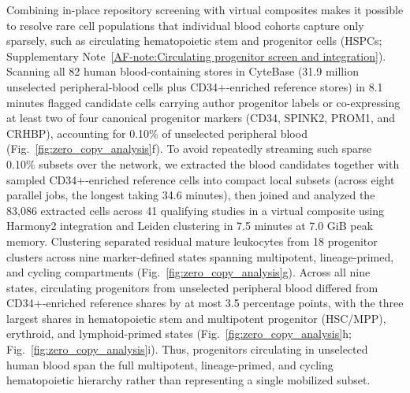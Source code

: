 \documentclass[11pt]{article}
\newcommand{\sref}[1]{\ref*{AF-#1}}
\begin{document}
Combining in-place repository screening with virtual composites makes it possible to resolve rare cell populations that individual blood cohorts capture only sparsely, such as circulating hematopoietic stem and progenitor cells (HSPCs; Supplementary Note~\sref{note:Circulating progenitor screen and integration}). Scanning all 82 human blood-containing stores in CyteBase (31.9 million unselected peripheral-blood cells plus CD34+-enriched reference stores) in 8.1 minutes flagged candidate cells carrying author progenitor labels or co-expressing at least two of four canonical progenitor markers (CD34, SPINK2, PROM1, and CRHBP), accounting for 0.10\% of unselected peripheral blood (Fig.~\ref{fig:zero_copy_analysis}f). To avoid repeatedly streaming such sparse 0.10\% subsets over the network, we extracted the blood candidates together with sampled CD34+-enriched reference cells into compact local subsets (across eight parallel jobs, the longest taking 34.6 minutes), then joined and analyzed the 83,086 extracted cells across 41 qualifying studies in a virtual composite using Harmony2 integration and Leiden clustering in 7.5 minutes at 7.0 GiB peak memory. Clustering separated residual mature leukocytes from 18 progenitor clusters across nine marker-defined states spanning multipotent, lineage-primed, and cycling compartments (Fig.~\ref{fig:zero_copy_analysis}g). Across all nine states, circulating progenitors from unselected peripheral blood differed from CD34+-enriched reference shares by at most 3.5 percentage points, with the three largest shares in hematopoietic stem and multipotent progenitor (HSC/MPP), erythroid, and lymphoid-primed states (Fig.~\ref{fig:zero_copy_analysis}h; Fig.~\ref{fig:zero_copy_analysis}i). Thus, progenitors circulating in unselected human blood span the full multipotent, lineage-primed, and cycling hematopoietic hierarchy rather than representing a single mobilized subset.
\end{document}
